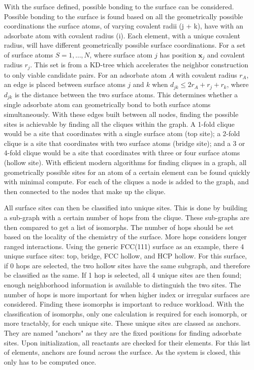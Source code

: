 \documentclass[journal=jacsat,manuscript=article]{achemso}
\begin{document}

With the surface defined, possible bonding to the surface can be considered.
Possible bonding to the surface is found based on all the geometrically possible coordinations the surface atoms, of varying covalent radii (j + k), have with an adsorbate atom with covalent radius (i).
Each element, with a unique covalent radius, will have different geometrically possible surface coordinations.
For a set of surface atoms $S={1,\ldots,N}$, where surface atom $j$ has position $\mathbf{x}_j$ and covalent radius $r_j$.
This set is from a KD-tree which accelerates the neighbor construction to only viable candidate pairs.
For an adsorbate atom $A$ with covalent radius $r_A$, an edge is placed between surface atoms $j$ and $k$ when $d_{jk}\leq 2r_A+r_j+r_k$, where $d_{jk}$ is the distance between the two surface atoms.
This determines whether a single adsorbate atom can geometrically bond to both surface atoms simultaneously.
With these edges built between all nodes, finding the possible sites is achievable by finding all the cliques within the graph.
A 1-fold clique would be a site that coordinates with a single surface atom (top site); a 2-fold clique is a site that coordinates with two surface atoms (bridge site); and a 3 or 4-fold clique would be a site that coordinates with three or four surface atoms (hollow site).
With efficient modern algorithms for finding cliques in a graph, all geometrically possible sites for an atom of a certain element can be found quickly with minimal compute.
For each of the cliques a node is added to the graph, and then connected to the nodes that make up the clique.

All surface sites can then be classified into unique sites.
This is done by building a sub-graph with a certain number of hops from the clique.
These sub-graphs are then compared to get a list of isomorphs.
The number of hops should be set based on the locality of the chemistry of the surface.
More hops considers longer ranged interactions.
Using the generic FCC(111) surface as an example, there 4 unique surface sites: top, bridge, FCC hollow, and HCP hollow.
For this surface, if 0 hops are selected, the two hollow sites have the same subgraph, and therefore be classified as the same.
If 1 hop is selected, all 4 unique sites are then found; enough neighborhood information is available to distinguish the two sites.
The number of hops is more important for when higher index or irregular surfaces are considered.
Finding these isomorphs is important to reduce workload.
With the classification of isomorphs, only one calculation is required for each isomorph, or more tractably, for each unique site.
These unique sites are classed as anchors.
They are named "anchors" as they are the fixed positions for finding adsorbate sites.
Upon initialization, all reactants are checked for their elements.
For this list of elements, anchors are found across the surface.
As the system is closed, this only has to be computed once.
\end{document}
